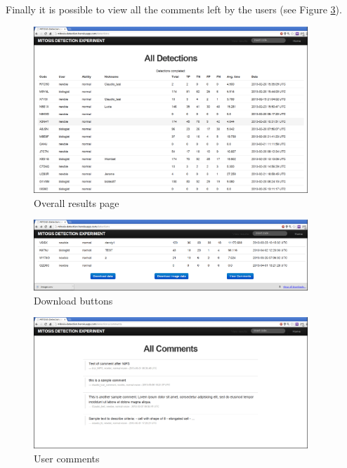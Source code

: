 \noindent Finally it is possible to view all the comments left by the users (see Figure \ref{ch5:fig10_comm}).


\begin{figure}[!hbt]
  \centering
	\includegraphics[width=0.92\textwidth]{./images/cr_MD_data_all_mod.png}
  \caption{Overall results page}
  \label{ch5:fig8_data}
\end{figure}

\begin{figure}[!hbt]
  \centering
	\includegraphics[width=0.92\textwidth]{./images/cr_MD_data_dl_mod.png}
  \caption{Download buttons}
  \label{ch5:fig9_dl}
\end{figure}

\begin{figure}[!hbt]
  \centering
	\includegraphics[width=0.92\textwidth]{./images/cr_MD_data_comments_mod.png}
  \caption{User comments}
  \label{ch5:fig10_comm}
\end{figure}

